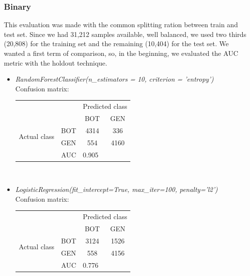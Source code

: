 \subsubsection{Binary}
This evaluation was made with the common splitting ration between train and test set. Since we had 31,212 samples available, well balanced, we used two thirds (20,808) for the training set and the remaining (10,404) for the test set.
We wanted a first term of comparison, so, in the beginning, we evaluated the AUC metric with the holdout technique.
\begin{itemize}
	\item[\PencilRight] \textit{RandomForestClassifier(n\_estimators = 10, criterion = 'entropy')}\\
	Confusion matrix:
	
	{
		\centering
		\begin{tabular}{@{}cc|cc@{}}
			\multicolumn{1}{c}{} &\multicolumn{1}{c}{} &\multicolumn{2}{c}{Predicted class} \\ 
			\multicolumn{1}{c}{} & 
			\multicolumn{1}{c|}{} & 
			\multicolumn{1}{c}{BOT} & 
			\multicolumn{1}{c}{GEN}  \\
			\cline{2-4}
			\multirow[c]{2}{*}{Actual class}
			& BOT  & 4314 & 336\\
			& GEN  & 554 & 4160\\
			\cline{2-4}
			\multicolumn{2}{r|}{AUC} & 
			\multicolumn{2}{l}{0.905}\\
		\end{tabular}\\
	}

	\item[\PencilRight] \textit{LogisticRegression(fit\_intercept=True, max\_iter=100, penalty='l2')}\\
	Confusion matrix:
	
	{
		\centering
		\begin{tabular}{@{}cc|cc@{}}
			\multicolumn{1}{c}{} &\multicolumn{1}{c}{} &\multicolumn{2}{c}{Predicted class} \\ 
			\multicolumn{1}{c}{} & 
			\multicolumn{1}{c|}{} & 
			\multicolumn{1}{c}{BOT} & 
			\multicolumn{1}{c}{GEN}  \\
			\cline{2-4}
			\multirow[c]{2}{*}{Actual class}
			& BOT  & 3124 & 1526\\
			& GEN  & 558 & 4156\\
			\cline{2-4}
			\multicolumn{2}{r|}{AUC} & 
			\multicolumn{2}{l}{0.776}\\
		\end{tabular}\\
	}


\end{itemize}
